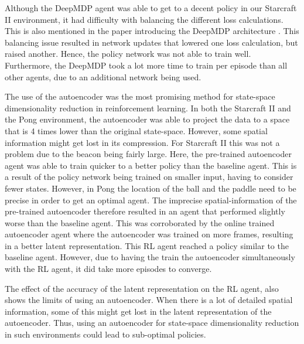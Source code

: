 Although the DeepMDP agent was able to get to a decent policy in our Starcraft II environment, it had difficulty with balancing the different loss calculations. This is also mentioned in the paper introducing the DeepMDP architecture \cite{deepmdp}. This balancing issue resulted in network updates that lowered one loss calculation, but raised another. Hence, the policy network was not able to train well. Furthermore, the DeepMDP took a lot more time to train per episode than all other agents, due to an additional network being used.

The use of the autoencoder was the most promising method for state-space dimensionality reduction in reinforcement learning. In both the Starcraft II and the Pong environment, the autoencoder was able to project the data to a space that is 4 times lower than the original state-space. However, some spatial information might get lost in its compression. For Starcraft II this was not a problem due to the beacon being fairly large. Here, the pre-trained autoencoder agent was able to train quicker to a better policy than the baseline agent. This is a result of the policy network being trained on smaller input, having to consider fewer states. However, in Pong the location of the ball and the paddle need to be precise in order to get an optimal agent. The imprecise spatial-information of the pre-trained autoencoder therefore resulted in an agent that performed slightly worse than the baseline agent. This was corroborated  by the online trained autoencoder agent where the autoencoder was trained on more frames, resulting in a better latent representation. This RL agent reached a policy similar to the baseline agent. However, due to having the train the autoencoder simultaneously with the RL agent, it did take more episodes to converge. 

The effect of the accuracy of the latent representation on the RL agent, also shows the limits of using an autoencoder. When there is a lot of detailed spatial information, some of this might get lost in the latent representation of the autoencoder. Thus, using an autoencoder for state-space dimensionality reduction in such environments could lead to sub-optimal policies.